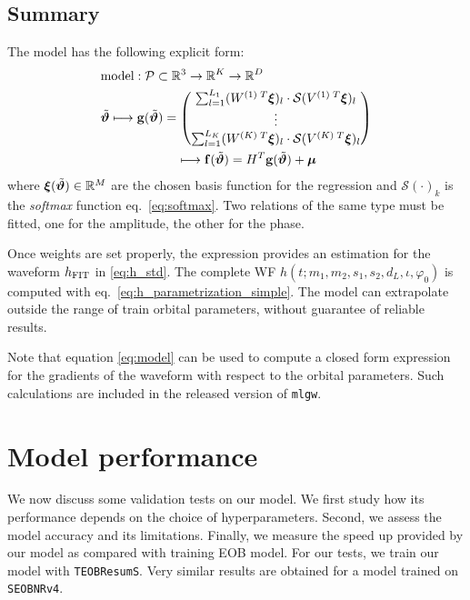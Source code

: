 \subsection{Summary}
The model has the following explicit form:
\begin{align}
	& \textrm{model}: \mathcal{P} \subset \mathbb{R}^3 \rightarrow \mathbb{R}^K \rightarrow \mathbb{R}^D \nonumber\\
	& {\tilde{\boldsymbol{\vartheta}}}
	\longmapsto  \mathbf{g}({\tilde{\boldsymbol{\vartheta}}} ) = 
		\begin{pmatrix}
		\sum_{l=1}^{L_1} (W^{(1)\;T} \boldsymbol{\xi})_l \cdot \mathcal{S}(V^{(1)\;T}\boldsymbol{\xi})_l \\
		\vdots \\
		\sum_{l=1}^{L_K}  (W^{(K)\;T} \boldsymbol{\xi})_l \cdot \mathcal{S}(V^{(K)\;T}\boldsymbol{\xi})_l
		\end{pmatrix}
	\nonumber \\	
	& \qquad \qquad \qquad \longmapsto \mathbf{f}({\tilde{\boldsymbol{\vartheta}}} ) = H^T \mathbf{g}({\tilde{\boldsymbol{\vartheta}}} ) + \boldsymbol{\mu} \label{eq:model}
\end{align}
where ${\boldsymbol{\xi}}({\tilde{\boldsymbol{\vartheta}}}) \in \mathbb{R}^M $ are the chosen basis function for the regression and $\mathcal{S}(\cdot)_k$ is the \textit{softmax} function eq.~\eqref{eq:softmax}.
Two relations of the same type must be fitted, one for the amplitude, the other for the phase.

Once weights are set properly, the expression provides an estimation for the waveform $h_{\rm FIT}$ in \eqref{eq:h_std}.
The complete WF $h(t;m_1,m_2, s_1, s_2, d_L, \iota, \varphi_0)$ is computed with eq.~\eqref{eq:h_parametrization_simple}.
The model can extrapolate outside the range of train orbital parameters, without guarantee of reliable results.

Note that equation \eqref{eq:model} can be used to compute a closed form expression for the gradients of the waveform with respect to the orbital parameters. Such calculations are included in the released version of \texttt{mlgw}.

\section{Model performance}
\label{sec:performance}
We now discuss some validation tests on our model. We first study how its performance depends on the choice of hyperparameters. Second, we assess the model accuracy and its limitations.
Finally, we measure the speed up provided by our model as compared with training EOB model.
For our tests, we train our model with \texttt{TEOBResumS}. Very similar results are obtained for a model trained on \texttt{SEOBNRv4}.

